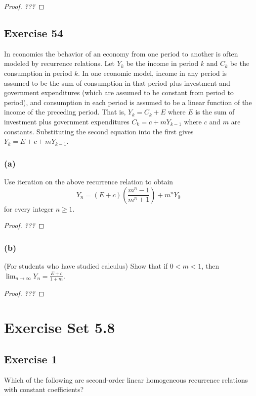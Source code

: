 \documentclass[14pt]{extarticle}
\newcommand{\dps}{\displaystyle}
\begin{document}
\begin{proof}
    {\it ???}
\end{proof}

\subsection{Exercise 54}
In economics the behavior of an economy from one period to another is often modeled by recurrence relations. Let $Y_k$
be the income in period $k$ and $C_k$ be the consumption in period $k$. In one economic model, income in any period is
assumed to be the sum of consumption in that period plus investment and government expenditures (which are assumed
to be constant from period to period), and consumption in each period is assumed to be a linear function of the
income of the preceding period. That is, \(Y_k = C_k + E\) where $E$ is the sum of investment plus government
expenditures \(C_k = c + m Y_{k-1}\) where $c$ and $m$ are constants. Substituting the second equation into the first
gives \(Y_k = E + c + m Y_{k-1}\).

\subsubsection{(a)}
Use iteration on the above recurrence relation to obtain
\[
    Y_n = (E + c)\left(\frac{m^n - 1}{m^n + 1}\right) + m^n Y_0
\]
for every integer \(n \geq 1\).

\begin{proof}
    {\it ???}
\end{proof}

\subsubsection{(b)}
(For students who have studied calculus) Show that if \(0 < m < 1\), then \(\dps \lim_{n \to \infty} Y_n = \frac{E + c}{1 + m}\).

\begin{proof}
    {\it ???}
\end{proof}

\section{Exercise Set 5.8}

\subsection{Exercise 1}
Which of the following are second-order linear homogeneous recurrence relations with constant coefficients?
\end{document}
